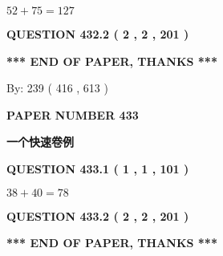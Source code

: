 \documentclass{ctexart}
\begin{document}
  
 
 

$ %
52 +  %
75=   %
127$
 
 
  
\vspace{0.2in}
  
{\textbf{\Large{QUESTION
432.2 
 ( 2 , 2 , 201 )
}}}
  
  
   
   
 \vspace{0.2in}
 
   
   
   
   
\vspace{1.0in} 
{\textbf{\large{ *** END OF PAPER, THANKS *** }}} 
   
   
\hspace{1.0in} By: 
 239 ( 416 ,  613 )
   
   
   
   
\newpage 
\setcounter{page}{ 
   433001 } 
   
   
   
   
 {\textbf{ \Large{ PAPER NUMBER  433  }}}
   
   
\vspace{0.2in}
   
   
   
   
   
   
 \vspace{0.2in}
{\LARGE {\textbf{ 一个快速卷例}}}
   
   
  
\vspace{0.2in}
  
{\textbf{\Large{QUESTION
433.1 
 ( 1 , 1 , 101 )
}}}
  
  
 
 

$ %
38 +  %
40=   %
78$
 
 
  
\vspace{0.2in}
  
{\textbf{\Large{QUESTION
433.2 
 ( 2 , 2 , 201 )
}}}
  
  
   
   
 \vspace{0.2in}
 
   
   
   
   
\vspace{1.0in} 
{\textbf{\large{ *** END OF PAPER, THANKS *** }}} 
   
\end{document}
